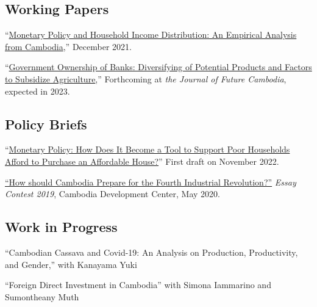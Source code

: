 \documentclass[10pt,a4paper]{article}
\begin{document}
\subsection*{Working Papers}

	“\href{https://kosalnith.github.io/research/papers/MPHI.pdf}{Monetary Policy and Household Income Distribution: An Empirical Analysis from Cambodia},” December 2021.\\ \vspace{-.5em}
	
	“\href{https://kosalnith.github.io/research/papers/GOB.pdf}{Government Ownership of Banks: Diversifying of Potential Products and Factors to Subsidize Agriculture},” Forthcoming at \textit{the Journal of Future Cambodia}, expected in 2023.

\subsection*{Policy Briefs}
	“\href{}{Monetary Policy: How Does It Become a Tool to Support Poor Households Afford to Purchase an Affordable House?}” First draft on November 2022. \\ \vspace{-.5em}
	
		\href{https://cd-center.org/en/essay-contest-2019-first-place-winner/}{``How should Cambodia Prepare for the Fourth Industrial Revolution?''} \textit{Essay Contest 2019}, Cambodia Development Center, May 2020.

\subsection*{Work in Progress}
	
	``Cambodian Cassava and Covid-19: An Analysis on Production, Productivity, and Gender,'' with Kanayama Yuki
	
	``Foreign Direct Investment in Cambodia'' with Simona Iammarino and Sumontheany Muth
\end{document}
